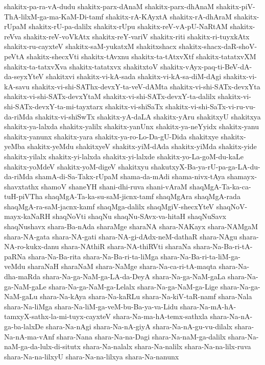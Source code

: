 {shakitx-pa-ra-vA-dudu
shakitx-parx-dAnaM
shakitx-parx-dhAnaM
shakitx-piV-ThA-lilxM-ga-ma-KaM-Di-tamf
shakitx-rA-KAyxtA
shakitx-rA-dhAraM
shakitx-rUpaM
shakitx-rU-pa-dalilx
shakitx-rUpu
shakitx-reV-vA-pU-NaRtAM
shakitx-reVva
shakitx-reV-voVkAtx
shakitx-reY-variV
shakitx-riti
shakitx-ri-tuyxkAtx
shakitx-ru-cayxteV
shakitx-saM-yukatxM
shakitxshacx
shakitx-shacx-daR-shoV-peVtA
shakitx-shecxVti
shakitx-tAvxnu
shakitx-ta-tAtxvXtf
shakitx-tatatxvXM
shakitx-ta-tatxvXva
shakitx-tatatxvx
shakitxtoV
shakitx-vAyx-paq-ti-BeV-dA-da-seyxYteV
shakitxvi
shakitx-vi-kA-sada
shakitx-vi-kA-sa-diM-dAgi
shakitx-vi-kA-savu
shakitx-vi-shi-SAThx-devxY-ta-veV-dAMta
shakitx-vi-shi-SATx-devxYta
shakitx-vi-shi-SATx-devxYtaM
shakitx-vi-shi-SATx-devxY-ta-dalilx
shakitx-vi-shi-SATx-devxY-ta-mi-tayxtarx
shakitx-vi-shiSaTx
shakitx-vi-shi-SaTx-vi-ru-vu-da-riMda
shakitx-vi-shiSwTx
shakitx-yA-daLA
shakitx-yAru
shakitxyU
shakitxya
shakitx-ya-lalxda
shakitx-yalilx
shakitx-yanUnx
shakitx-ya-neYyidx
shakitx-yanu
shakitx-yanunx
shakitx-yara
shakitx-ya-ro-Lo-Da-gU-Dida
shakitxye
shakitx-yeMba
shakitx-yeMdu
shakitxyeV
shakitx-yiM-dAda
shakitx-yiMda
shakitx-yide
shakitx-yilalx
shakitx-yi-lalxda
shakitx-yi-lalxde
shakitx-yo-La-goM-du-kaLe
shakitx-yoMdeV
shakitx-yoM-digeV
shakitxyu
shakutxyX-Ba-ya-rU-pa-ga-LA-du-da-riMda
shamA-di-Sa-Takx-rUpaM
shama-da-mAdi
shama-nivx-tAya
shamayx-shavxtathx
shamoV
shaneYH
shani-dhi-ruva
shani-vAraM
shaqMgA-Ta-ka-ca-tuH-piVTha
shaqMgA-Ta-ka-su-saM-jicnx-tamf
shaqMgAra
shaqMgA-rada
shaqMgA-ra-saM-jacnx-kamf
shaqMga-dalilx
shaqMgiV-shecxYteV
shaqNoV-mayx-kaNaRH
shaqNoVti
shaqNu
shaqNu-SAvx-va-hitaH
shaqNuSavx
shaqNushavx
shara-Ba-nAda
sharaMge
sharaNA
shara-NAKayx
shara-NAMgaM
shara-NA-gata
shara-NA-gati
shara-NA-gi-dAdx-neM-dathaR
shara-NAgu
shara-NA-ro-kukx-danu
shara-NAthiR
shara-NA-thiRVti
sharaNa
shara-Na-Ba-ri-tA-paRNa
shara-Na-Ba-rita
shara-Na-Ba-ri-ta-liMga
shara-Na-Ba-ri-ta-liM-ga-veMdu
sharaNaH
sharaNaM
shara-NaMge
shara-Na-ca-ri-tA-maqta
shara-Na-dha-maRda
shara-Na-ga-NaM-ga-LA-da-DeyA
shara-Na-ga-NaM-gaLa
shara-Na-ga-NaM-gaLe
shara-Na-ga-NaM-ga-Lelalx
shara-Na-ga-NaM-ga-Lige
shara-Na-ga-NaM-gaLu
shara-Na-kAya
shara-Na-kaRLu
shara-Na-kiV-taR-namf
shara-Nala
shara-Na-liMga
shara-Na-liM-ga-veM-bu-Ba-ya-va-Lidu
shara-Na-mA-hA-tamxyX-sathx-la-mi-tuyx-cayxteV
shara-Na-ma-hA-temx-sathxla
shara-Na-nA-ga-ba-lalxDe
shara-Na-nAgi
shara-Na-nA-giyA
shara-Na-nA-gu-vu-dilalx
shara-Na-nA-ma-vAnf
shara-Nana
shara-Na-na-Dagi
shara-Na-naM-ga-dalilx
shara-Na-naM-ga-da-lulx-di-situtx
shara-Na-nalalx
shara-Na-nalilx
shara-Na-na-lilx-ruva
shara-Na-na-lilxyU
shara-Na-na-lilxya
shara-Na-nanunx
}
